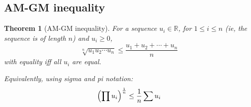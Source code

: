 \documentclass[fleqn,a4paper,11pt]{article}
\newcommand{\setstyle}{\mathbb}
\newcommand{\Reals}{\setstyle R}
\newtheorem{theorem}{Theorem}[section]
\begin{document}
    \subsection{AM-GM inequality}

    \begin{theorem}[AM-GM inequality]
    For a sequence \(u_i \in \Reals\), for \(1 \le i \le n\) (ie, the
    sequence is of length \(n\)) and \(u_i \ge 0\),
    \begin{equation*}
    \sqrt[n]{u_1 u_2 \dotsm u_n} \le \frac{u_1 + u_2 + \dotsb + u_n}{n}
    \end{equation*}
    with equality iff all \(u_i\) are equal.

    Equivalently, using sigma and pi notation:
    \begin{equation*}
    \pqty{\prod u_i}^\frac{1}{n} \le \frac{1}{n}\sum u_i
    \end{equation*}
    \end{theorem}
\end{document}
